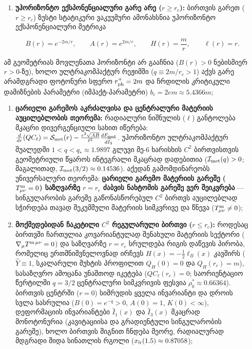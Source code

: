 \documentclass[11pt,a4paper]{article}
\begin{document}
\begin{enumerate}[label=\arabic*.]
\item \textbf{უჰორიზონტო ექსპონენციალური გარე არე ($r \ge r_c$):} ბირთვის გარეთ ($r \ge r_c$) ზუსტი სტატიკური ვაკუუმური ამონახსნია უჰორიზონტო ექსპონენციალური მეტრიკა

\[
B(r) = e^{-2m/r}, \qquad A(r) = e^{2m/r}, \qquad H(r) = \frac{m}{r}, \qquad \ell(r) = r.
\]

\end{enumerate}
ამ გეომეტრიას მოვლენათა ჰორიზონტი არ გააჩნია ($B(r) > 0$ ნებისმიერ $r > 0$-ზე), ხოლო ულტრაკომპაქტურ რეჟიმში ($q \equiv 2m/r_c > 1$) აქვს გარე არამდგრადი ფოტონური სფერო $r_{\rm ph}^+ = 2m$ და ჩრდილის კრიტიკული დამიზნების პარამეტრი (იმპაქტ-პარამეტრი) $b_c = 2e m \approx 5.4366 m$;
\begin{enumerate}[label=\arabic*.]
\item \textbf{ცარიელი გარემოს აკრძალვისა და ცენტრალური მატერიის აუცილებლობის თეორემა:} რადიალური ნიშნულის ($\ell$) განტოლება მკაცრი დივერგენციული სახით იწერება: $\frac{d}{dr}(Q C_\ell) = \mathcal{S}_{\rm met}(r) - \frac{r^2\sqrt{AB}}{\ell^2}\frac{dF_{\rm med}}{d\widehat{I}_3}$. უჰორიზონტო ულტრაკომპაქტურ შუალედში $1 < q < q_* \approx 1.9897$ გლუვი მე-6 ხარისხის $C^2$ ბირთვისთვის გეომეტრიული წყაროს ინტეგრალი მკაცრად დადებითია ($\mathcal{I}_{\rm met}(q) > 0$; მაგალითად, $\mathcal{I}_{\rm met}(3/2) \approx 0.14536$). აქედან გამომდინარეობს უნივერსალური თეორემა: \textbf{ცარიელი გარემო მატერიის გარეშე ($T^{\rm m}_{\mu\nu} = 0$) საზღვარზე $r = r_c$ ძაბვის ნახტომის გარეშე ვერ შეიკვრება} — სინგულარობის გარეშე გაწონასწორებულ $C^2$ ბირთვს აუცილებლად სჭირდება თავად შეკუმშული მატერიის სიმკვრივე და წნევა ($T^{\rm m}_{\mu\nu} \neq 0$);
\item \textbf{მოქმედებიდან ჩაკეტილი $C^2$ რეგულარული ბირთვი ($r \le r_c$):} როდესაც ბირთვში ჩართულია კოვარიანტულად შენახული მატერიის სექტორი ($\nabla_\mu T^{\rm m\,\mu\nu} = 0$) და საზღვარზე $r = r_c$ სრულდება რიგის დაწევის პირობა, რომელიც ერთმნიშვნელოვნად ირჩევს $H(x) = -\frac{1}{2}\ell_B(x)$ კავშირს ($\widehat{Y} \equiv 1$, სკალარული მუხტის პროფილით $Q_H(0)=0$ და $Q_H(r_c)=m$), სასაზღვრო ამოცანა უნაშთოდ იკეტება ($Q C_\ell(r_c) = 0$; საორიენტაციო წერტილში $q = 3/2$ ცენტრალური სიმკვრივის ფესვია $\rho_0^* \approx 0.66364$). ბირთვის ცენტრში ($r=0$) სიმრუდის ყველა ინვარიანტი და დროის სვლა სასრულია ($B(0) = e^{-q} > 0$, $A(0) = 1$, $K(0) < \infty$), დეფორმაციის ინვარიანტები $\widehat{I}_1(x)$ და $\widehat{I}_3(x)$ მკაცრად მონოტონურია (კავიტაციისა და გრადიენტული სინგულარობის გარეშე), ხოლო ბირთვის შიგნით ჩნდება მეორე, რადიალურად მდგრადი შიდა სინათლის რგოლი ($x_{\rm lr}(1.5) \approx 0.87058$);

\end{enumerate}
\end{document}
